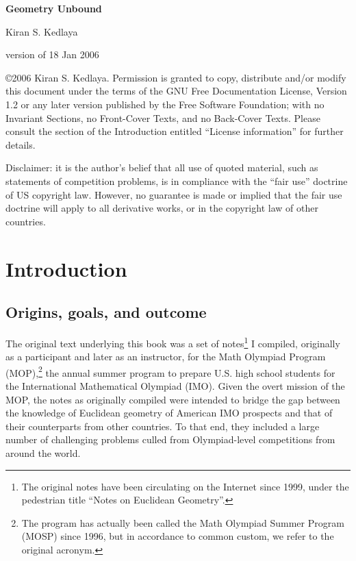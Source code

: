\documentclass[12pt]{book}
\numberwithin{exc}{section}
\numberwithin{figure}{section}
\numberwithin{equation}{theorem}
\begin{document}

\begin{titlepage}
\begin{center}
\textbf{\large Geometry Unbound}

\vspace{1in}
Kiran S. Kedlaya

version of 18 Jan 2006
\end{center}

\vspace{1in}

\noindent
\copyright 2006 Kiran S. Kedlaya. 
Permission is granted to copy, distribute and/or modify this document
under the terms of the GNU Free Documentation License, Version 1.2
or any later version published by the Free Software Foundation;
with no Invariant Sections, no Front-Cover Texts, and no Back-Cover Texts.
Please consult the section of the Introduction
entitled ``License information'' for further details.

\medskip
\noindent
Disclaimer: it is the author's belief that all use of quoted material, such as
statements of competition problems, is in compliance with the ``fair use''
doctrine of US copyright law. However, no guarantee is made or implied that
the fair use doctrine will apply to all derivative works, or in the copyright
law of other countries.


\end{titlepage}
\pagebreak

\tableofcontents
\newpage

\setcounter{secnumdepth}{-1}
\chapter{Introduction}

\section{Origins, goals, and outcome}

The original text underlying this book was a set of notes\footnote{The
original notes have been circulating on the Internet since 1999, under
the pedestrian title ``Notes on Euclidean Geometry''.} I compiled,
originally as a participant and later as an instructor, for the Math
Olympiad Program (MOP),\footnote{The program has actually been called the
Math Olympiad Summer Program (MOSP) since 1996, but in accordance to common custom, we refer to the original acronym.} 
the annual summer program to prepare U.S. 
high school students for the International Mathematical Olympiad 
(IMO).
Given the overt mission of the MOP, the notes as originally compiled
were intended to bridge the gap between the knowledge of Euclidean geometry
of American IMO prospects and that of their counterparts from other
countries. To that end, they included a large number of challenging
problems culled from Olympiad-level competitions from around the world.
\end{document}
